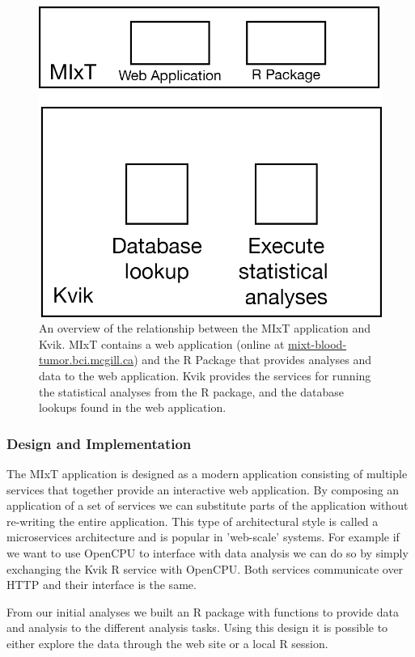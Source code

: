 \begin{figure}[h!]
\centering
\includegraphics{figures/kvik-mixt.png}
\caption{An overview of the relationship between the MIxT application and Kvik.
MIxT contains a web application (online at \url{mixt-blood-tumor.bci.mcgill.ca})
and the R Package that provides analyses and data to the web application. Kvik
provides the services for running the statistical analyses from the R package,
and the database lookups found in the web application.} 
\label{kvik-mixt}
\end{figure} 

\subsubsection*{Design and Implementation}
The MIxT application is designed as a modern application consisting of multiple
services that together provide an interactive web application. By composing an
application of a set of services we can substitute parts of the application
without re-writing the entire application. This type of architectural style is
called a microservices architecture and is popular in 'web-scale' systems. For
example if we want to use OpenCPU to interface with data analysis we can do so
by simply exchanging the Kvik R service with OpenCPU. Both services communicate
over HTTP and their interface is the same. 

From our initial analyses we built
an R package with functions to provide data and analysis to the different
analysis tasks. Using this design it is possible to either explore the data
through the web site or a local R session. 

